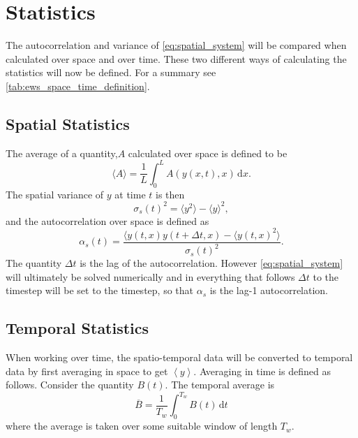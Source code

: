 \section{Statistics}
The autocorrelation and variance of \cref{eq:spatial_system} will be compared when calculated over space and over time. These two different ways of calculating the statistics  will now
be defined. For a summary see \cref{tab:ews_space_time_definition}.

\subsection{Spatial Statistics}

The average of a quantity,$A$ calculated over space is defined to be
\begin{equation}
  \label{eq:definition_of_average}
  \langle A \rangle = \frac{1}{L}\int_0^L A(y(x,t),x) \,\mathrm{d}x.
\end{equation}
The spatial variance of $y$ at time $t$ is then
\begin{equation}
  \label{eq:spatial_variance}
  \sigma_s(t)^2 = \langle y^2 \rangle - \langle y \rangle^2,
\end{equation}
and the autocorrelation over space is defined as
\begin{equation}
  \label{eq:spatial_autocorrelation}
  \alpha_s(t) = \frac{\langle y(t,x)y(t+\Delta t,x) - \langle y(t,x)^2 \rangle }{\sigma_s(t)^2}.
\end{equation}
The quantity $\Delta t$ is the lag of the autocorrelation. However \cref{eq:spatial_system} will ultimately be solved numerically and
in everything that follows $\Delta t$ to the timestep will be set to the timestep, so that $\alpha_s$ is the lag-1 autocorrelation.

\subsection{Temporal Statistics}
When working over time, the spatio-temporal data will be converted to temporal data by first averaging in space to get $\left\langle y \right\rangle$.
Averaging in time is defined as follows. Consider the quantity $B(t)$. The temporal average is
\begin{equation}
  \label{eq:definition_of_temporal_average}
  \overline{B} = \frac{1}{T_w}\int_0^{T_w}B(t)\,\mathrm{d}t
\end{equation}
where the average is taken over some suitable window of length $T_w$.

